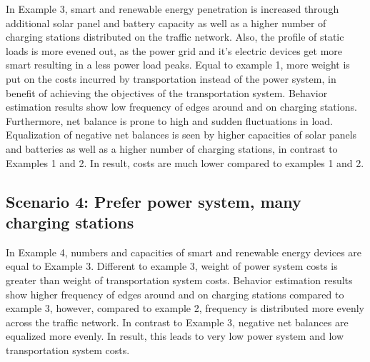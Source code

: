 In Example 3, smart and renewable energy penetration is increased through additional solar panel and battery capacity as well as a higher number of charging stations distributed on the traffic network. Also, the profile of static loads is more evened out, as the power grid and it's electric devices get more smart resulting in a less power load peaks. 
Equal to example 1, more weight is put on the costs incurred by transportation instead of the power system, in benefit of achieving the objectives of the transportation system. Behavior estimation results show low frequency of edges around and on charging stations. Furthermore, net balance is prone to high and sudden fluctuations in load. Equalization of negative net balances is seen by higher capacities of solar panels and batteries as well as a higher number of charging stations, in contrast to Examples 1 and 2. In result, costs are much lower compared to examples 1 and 2.

\subsection*{Scenario 4: Prefer power system, many charging stations}

In Example 4, numbers and capacities of smart and renewable energy devices are equal to Example 3. Different to example 3, weight of power system costs is greater than weight of transportation system costs. Behavior estimation results show higher frequency of edges around and on charging stations compared to example 3, however, compared to example 2, frequency is distributed more evenly across the traffic network. In contrast to Example 3, negative net balances are equalized more evenly. In result, this leads to very low power system and low transportation system costs.